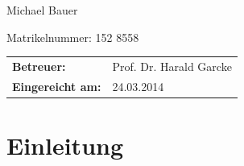 \begin{center}
\begin{large}
Michael Bauer
\end{large}

\begin{small}
Matrikelnummer: 152 8558
\end{small}

\vspace{1cm}
\begin{tabular}{ll}
{\bf Betreuer:} &Prof. Dr. Harald Garcke\\
{\bf Eingereicht am:} &24.03.2014\\
\end{tabular}

\end{center}
\clearpage

\pagestyle{useheadings} %

\tableofcontents
\listoffigures
\listoftables

\chapter{Einleitung}\label{c.Einleitung}


